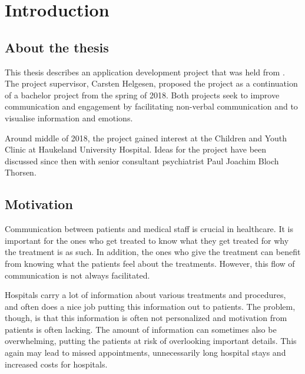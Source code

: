 \chapter{Introduction}
\label{ch:introduction}

\section{About the thesis}
\label{sec:about}

This thesis describes an application development project that was held from {\printdayoff {}}. The project supervisor, Carsten Helgesen, proposed the project as a continuation of a bachelor project from the spring of 2018. Both projects seek to improve communication and engagement by facilitating non-verbal communication and to visualise information and emotions.

Around middle of 2018, the project gained interest at the Children and Youth Clinic at Haukeland University Hospital. Ideas for the project have been discussed since then with senior consultant psychiatrist Paul Joachim Bloch Thorsen.

\section{Motivation}
\label{sec:motivation}

Communication between patients and medical staff is crucial in healthcare. It is important for the ones who get treated to know what they get treated for why the treatment is as such. In addition, the ones who give the treatment can benefit from knowing what the patients feel about the treatments. However, this flow of communication is not always facilitated.



Hospitals carry a lot of information about various treatments and procedures, and often does a nice job putting this information out to patients. The problem, though, is that this information is often not personalized and motivation from patients is often lacking. The amount of information can sometimes also be overwhelming, putting the patients at risk of overlooking important details. This again may lead to missed appointments, unnecessarily long hospital stays and increased costs for hospitals.


